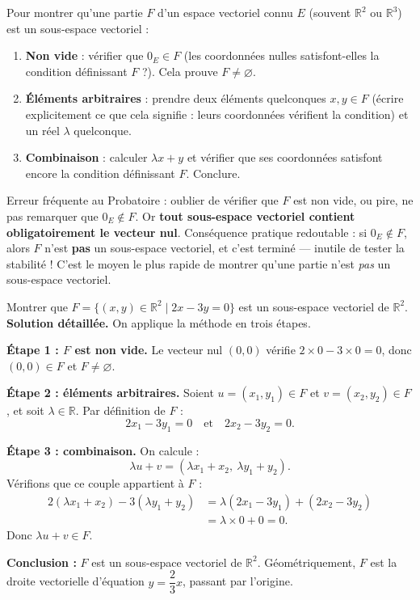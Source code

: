 \documentclass[11pt]{article}
\newcounter{popsec}
\newcounter{popsub}
\newcommand{\courssub}[1]{%
  \stepcounter{popsub}%
  \par\vspace{9pt}\noindent{\popxbold\fontsize{11.5}{13}\selectfont\color{popink}{\color{poporange}\thepopsec.\thepopsub}\hspace{6pt}#1}\par\nopagebreak\vspace{4pt}
}
\begin{document}
\begin{methode}
Pour montrer qu'une partie $F$ d'un espace vectoriel connu $E$ (souvent $\mathbb{R}^2$ ou $\mathbb{R}^3$) est un sous-espace vectoriel :
\begin{enumerate}
\item \textbf{Non vide} : vérifier que $0_E \in F$ (les coordonnées nulles satisfont-elles la condition définissant $F$ ?). Cela prouve $F \neq \varnothing$.
\item \textbf{Éléments arbitraires} : prendre deux éléments quelconques $x, y \in F$ (écrire explicitement ce que cela signifie : leurs coordonnées vérifient la condition) et un réel $\lambda$ quelconque.
\item \textbf{Combinaison} : calculer $\lambda x + y$ et vérifier que ses coordonnées satisfont encore la condition définissant $F$. Conclure.
\end{enumerate}
\end{methode}

\begin{attention}
Erreur fréquente au Probatoire : oublier de vérifier que $F$ est non vide, ou pire, ne pas remarquer que $0_E \notin F$. Or \textbf{tout sous-espace vectoriel contient obligatoirement le vecteur nul}. Conséquence pratique redoutable : si $0_E \notin F$, alors $F$ n'est \textbf{pas} un sous-espace vectoriel, et c'est terminé — inutile de tester la stabilité ! C'est le moyen le plus rapide de montrer qu'une partie n'est \emph{pas} un sous-espace vectoriel.
\end{attention}

\courssub{Exemples dans $\mathbb{R}^2$ et $\mathbb{R}^3$}

\begin{exoresolu}
Montrer que $F = \{(x,y) \in \mathbb{R}^2 \mid 2x - 3y = 0\}$ est un sous-espace vectoriel de $\mathbb{R}^2$.
\tcblower
\textbf{Solution détaillée.} On applique la méthode en trois étapes.

\textbf{Étape 1 : $F$ est non vide.} Le vecteur nul $(0,0)$ vérifie $2 \times 0 - 3 \times 0 = 0$, donc $(0,0) \in F$ et $F \neq \varnothing$.

\textbf{Étape 2 : éléments arbitraires.} Soient $u = (x_1, y_1) \in F$ et $v = (x_2, y_2) \in F$, et soit $\lambda \in \mathbb{R}$. Par définition de $F$ :
\[
2x_1 - 3y_1 = 0 \quad \text{et} \quad 2x_2 - 3y_2 = 0.
\]

\textbf{Étape 3 : combinaison.} On calcule :
\[
\lambda u + v = (\lambda x_1 + x_2,\ \lambda y_1 + y_2).
\]
Vérifions que ce couple appartient à $F$ :
\begin{align*}
2(\lambda x_1 + x_2) - 3(\lambda y_1 + y_2) &= \lambda(2x_1 - 3y_1) + (2x_2 - 3y_2)\\
&= \lambda \times 0 + 0 = 0.
\end{align*}
Donc $\lambda u + v \in F$.

\textbf{Conclusion :} $F$ est un sous-espace vectoriel de $\mathbb{R}^2$. Géométriquement, $F$ est la droite vectorielle d'équation $y = \dfrac{2}{3}x$, passant par l'origine.
\end{exoresolu}
\end{document}
